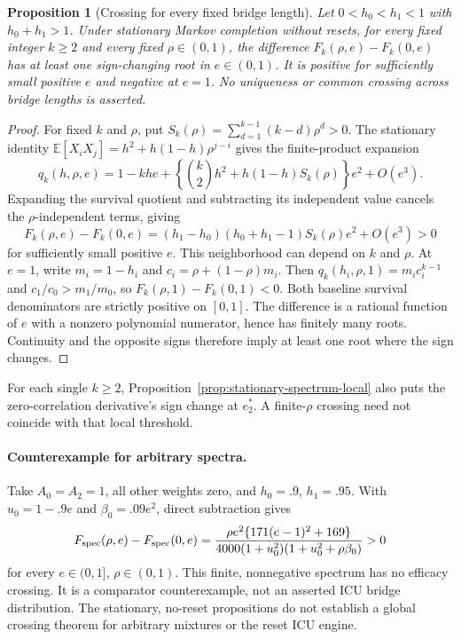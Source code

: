 \documentclass[11pt]{article}
\newtheorem{proposition}{Proposition}
\newcommand{\E}{\mathbb E}
\begin{document}
\begin{proposition}[Crossing for every fixed bridge length]
\label{prop:stationary-fixed-k-crossing}
Let $0<h_0<h_1<1$ with $h_0+h_1>1$. Under stationary Markov completion
without resets, for every fixed integer $k\ge2$ and every fixed
$\rho\in(0,1)$, the difference
$F_k(\rho,e)-F_k(0,e)$ has at least one sign-changing root in $e\in(0,1)$.
It is positive for sufficiently small positive $e$ and negative at $e=1$.
No uniqueness or common crossing across bridge lengths is asserted.
\end{proposition}
\begin{proof}
For fixed $k$ and $\rho$, put
$S_k(\rho)=\sum_{d=1}^{k-1}(k-d)\rho^d>0$.
The stationary identity
$\E[X_iX_j]=h^2+h(1-h)\rho^{j-i}$ gives the finite-product expansion
\[
q_k(h,\rho,e)=1-khe+
\left\{\binom{k}{2}h^2+h(1-h)S_k(\rho)\right\}e^2+O(e^3).
\]
Expanding the survival quotient and subtracting its independent value cancels
the $\rho$-independent terms, giving
\[
F_k(\rho,e)-F_k(0,e)
=(h_1-h_0)(h_0+h_1-1)S_k(\rho)e^2+O(e^3)>0
\]
for sufficiently small positive $e$. This neighborhood can depend on $k$
and $\rho$. At $e=1$, write $m_i=1-h_i$ and
$c_i=\rho+(1-\rho)m_i$. Then $q_k(h_i,\rho,1)=m_ic_i^{k-1}$ and
$c_1/c_0>m_1/m_0$, so $F_k(\rho,1)-F_k(0,1)<0$.
Both baseline survival denominators are strictly positive on $[0,1]$.
The difference is a rational function of $e$ with a nonzero polynomial
numerator, hence has finitely many roots. Continuity and the opposite signs
therefore imply at least one root where the sign changes.
\end{proof}
For each single $k\ge2$, Proposition~\ref{prop:stationary-spectrum-local}
also puts the zero-correlation derivative's sign change at $e_2^*$.
A finite-$\rho$ crossing need not coincide with that local threshold.

\paragraph{Counterexample for arbitrary spectra.}
Take $A_0=A_2=1$, all other weights zero, and $h_0=.9$, $h_1=.95$.
With $u_0=1-.9e$ and $\beta_0=.09e^2$, direct subtraction gives
\[
F_{\rm spec}(\rho,e)-F_{\rm spec}(0,e)
=\frac{\rho e^2\{171(e-1)^2+169\}}
{4000(1+u_0^2)(1+u_0^2+\rho\beta_0)}>0
\]
for every $e\in(0,1]$, $\rho\in(0,1)$. This finite, nonnegative spectrum
has no efficacy crossing. It is a comparator counterexample, not an asserted
ICU bridge distribution. The stationary, no-reset propositions do not
establish a global crossing theorem for arbitrary mixtures or the reset ICU
engine.
\end{document}
